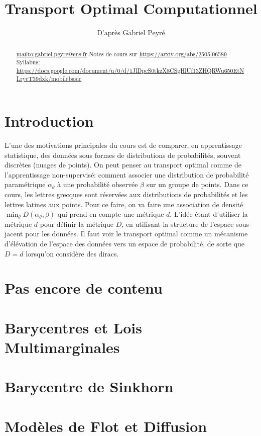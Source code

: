 \documentclass[info, math, french]{mpb-cours}
\title{Transport Optimal Computationnel}
\author{D'après Gabriel Peyré}
\begin{document}
\bettertitle
\begin{abstract}
	\url{mailto:gabriel.peyre@ens.fr}
	Notes de cours sur \url{https://arxiv.org/abs/2505.06589}
	Syllabus: \url{https://docs.google.com/document/u/0/d/1JlDpcS0tkzX8CSgHlUf13ZHQRWu650EtNLrycT39dxk/mobilebasic}
\end{abstract}

\section*{Introduction}
L'une des motivations principales du cours est de comparer, en apprentissage statistique,
des données sous formes de distributions de probabilités, souvent discrètes (nuages de points).
On peut penser au transport optimal comme de l'apprentissage non-supervisé: comment associer une
distribution de probabilité paramétrique $\alpha_{\theta}$ à une probabilité observée $\beta$ sur un groupe de points.
Dans ce cours, les lettres grecques sont réservées aux distributions de probabilités et les lettres latines
aux points.
Pour ce faire, on va faire une association de densité $\min_{\theta} D(\alpha_{\theta}, \beta)$ qui
prend en compte une métrique $d$.
L'idée étant d'utiliser la métrique $d$ pour définir la métrique $D$, en utilisant la structure
de l'espace sous-jacent pour les données.
Il faut voir le transport optimal comme un mécanisme d'élévation de l'espace des données vers un espace
de probabilité, de sorte que $D = d$ lorsqu'on considère des diracs.









\section{Pas encore de contenu}

\section{Barycentres et Lois Multimarginales}

\section{Barycentre de Sinkhorn}

\section{Modèles de Flot et Diffusion}
\end{document}
